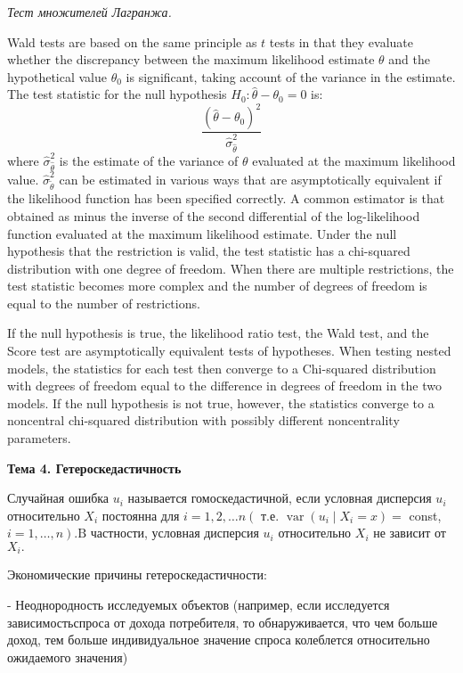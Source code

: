 \documentclass[a4paper,8pt]{article} %
\begin{document}
\textit{Тест множителей Лагранжа.}

Wald tests are based on the same principle as $t$ tests in that they evaluate whether the discrepancy between the maximum likelihood estimate $\theta$ and the hypothetical value $\theta_{0}$ is significant, taking account of the variance in the estimate. The test statistic for the null hypothesis $H_{0}: \widehat{\theta}-\theta_{0}=0$ is:
$$
\frac{\left(\widehat{\theta}-\theta_{0}\right)^{2}}{\widehat{\sigma}_{\widehat{\theta}}^{2}}
$$
where $\hat{\sigma}_{\widehat{\theta}}^{2}$ is the estimate of the variance of $\theta$ evaluated at the maximum likelihood value. $\widehat{\sigma}_{\tilde{\theta}}^{2}$ can be estimated in various ways that are asymptotically equivalent if the likelihood function has been specified correctly. A common estimator is that obtained as minus the inverse of the second differential of the log-likelihood function evaluated at the maximum likelihood estimate. Under the null hypothesis that the restriction is valid, the test statistic has a chi-squared distribution with one degree of freedom. When there are multiple restrictions, the test statistic becomes more complex and the number of degrees of freedom is equal to the number of restrictions.


If the null hypothesis is true, the likelihood ratio test, the Wald test, and the Score test are asymptotically equivalent tests of hypotheses. When testing nested models, the statistics for each test then converge to a Chi-squared distribution with degrees of freedom equal to the difference in degrees of freedom in the two models. If the null hypothesis is not true, however, the statistics converge to a noncentral chi-squared distribution with possibly different noncentrality parameters. 

\textbf{Тема 4. Гетероскедастичность}

Случайная ошибка $u_{i}$ называется гомоскедастичной, если условная дисперсия $u_{i}$ относительно $X_{i}$ постоянна для $i=1,2, \ldots n\left(\right.$ т.е. $\operatorname{var}\left(u_{i} \mid X_{i}=x\right)=$ const, $\left.i=1, \ldots, n\right) . \mathrm{B}$
частности, условная дисперсия $u_{i}$ относительно $X_{i}$ не зависит от $X_{i} .$

Экономические    причины гетероскедастичности: 

- Неоднородность исследуемых объектов (например, если исследуется зависимостьспроса от дохода потребителя, то обнаруживается, что чем больше доход, тем больше индивидуальное значение спроса колеблется относительно ожидаемого значения)
\end{document}
